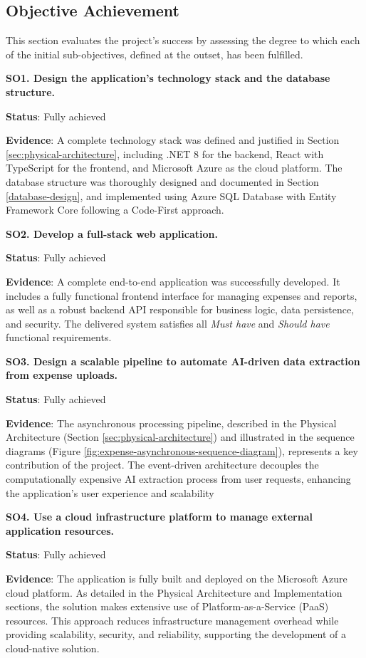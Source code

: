 \subsection{Objective Achievement}

This section evaluates the project's success by assessing the degree to which each of the initial sub-objectives, defined at the outset, has been fulfilled.

\textbf{SO1. Design the application's technology stack and the database structure.}

\textbf{Status}: Fully achieved

\textbf{Evidence}: A complete technology stack was defined and justified in Section \ref{sec:physical-architecture}, including .NET 8 for the backend, React with TypeScript for the frontend, and Microsoft Azure as the cloud platform. The database structure was thoroughly designed and documented in Section \ref{database-design}, and implemented using Azure SQL Database with Entity Framework Core following a Code-First approach.

\textbf{SO2. Develop a full-stack web application.}

\textbf{Status}: Fully achieved

\textbf{Evidence}: A complete end-to-end application was successfully developed. It includes a fully functional frontend interface for managing expenses and reports, as well as a robust backend API responsible for business logic, data persistence, and security. The delivered system satisfies all \textit{Must have} and \textit{Should have} functional requirements.

\textbf{SO3. Design a scalable pipeline to automate AI-driven data extraction from expense uploads.}

\textbf{Status}: Fully achieved

\textbf{Evidence}: The asynchronous processing pipeline, described in the Physical Architecture (Section \ref{sec:physical-architecture}) and illustrated in the sequence diagrams (Figure \ref{fig:expense-asynchronous-sequence-diagram}), represents a key contribution of the project. The event-driven architecture decouples the computationally expensive AI extraction process from user requests, enhancing the application's user experience and scalability

\textbf{SO4. Use a cloud infrastructure platform to manage external application resources.}

\textbf{Status}: Fully achieved

\textbf{Evidence}: The application is fully built and deployed on the Microsoft Azure cloud platform. As detailed in the Physical Architecture and Implementation sections, the solution makes extensive use of Platform-as-a-Service (PaaS) resources. This approach reduces infrastructure management overhead while providing scalability, security, and reliability, supporting the development of a cloud-native solution.

